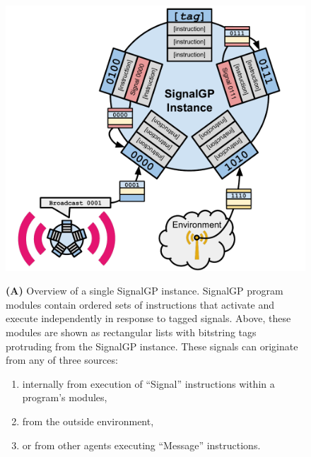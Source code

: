 \begin{figure}
\begin{center}
\begin{minipage}[t]{\linewidth}

\begin{minipage}[t]{\linewidth}
\centering
\vspace{0pt} %
\begin{minipage}{\textwidth}
{\hfil\includegraphics[width=0.5\linewidth]{img/signalgp-cartoon}\hfil}\\
{\textbf{(A)}
Overview of a single SignalGP instance.
SignalGP program modules contain ordered sets of instructions that activate and execute independently in response to tagged signals.
Above, these modules are shown as rectangular lists with bitstring tags protruding from the SignalGP instance.
These signals can originate from any of three sources:
\begin{enumerate}
  \item internally from execution of ``Signal'' instructions within a program's modules,
  \item from the outside environment,
  \item or from other agents executing ``Message'' instructions.
\end{enumerate}
}
\end{minipage}
\end{minipage}%


\end{minipage}
\end{center}
\end{figure}

